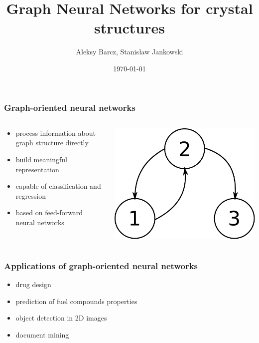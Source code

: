 \documentclass{beamer}
\author{Aleksy Barcz, Stanisław Jankowski}
\title{Graph Neural Networks for crystal structures}
\date{\today}
\institute{Warsaw University of Technology}
\begin{document}
\frame{\titlepage}

\begin{frame}
\frametitle{Graph-oriented neural networks}
\begin{columns}
	\begin{column}{0.66\textwidth}
		\begin{itemize}
			\item process information about graph structure directly
			\item build meaningful representation
			\item capable of classification and regression
			\item based on feed-forward neural networks
		\end{itemize}
	\end{column}
	\begin{column}{0.34\textwidth}
		\includegraphics[scale=0.4]{img/graph}
	\end{column}
\end{columns}
\end{frame}

\begin{frame}
\frametitle{Applications of graph-oriented neural networks}
\begin{itemize}
	\item drug design
	\item prediction of fuel compounds properties
	\item object detection in 2D images
	\item document mining
\end{itemize}
\end{frame}
\end{document}
